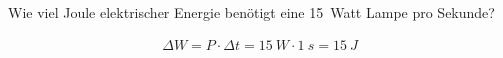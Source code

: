 
\begin{aufgabe}
Wie viel Joule elektrischer Energie benötigt eine \SI{15}{Watt} Lampe pro Sekunde?




\begin{loesung}
	\begin{eqnarray*}
	\Delta W = P \cdot \Delta t = \SI{15}{W} \cdot \SI{1}{s} = \SI{15}{J}
	\end{eqnarray*}
\end{loesung}
\end{aufgabe}
